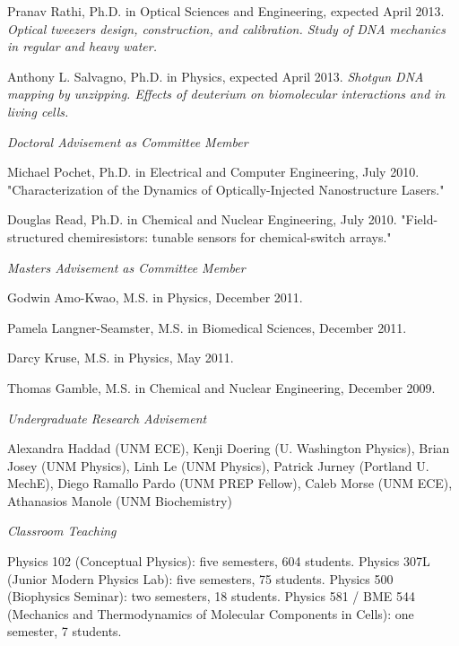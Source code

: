 \documentclass[11pt]{article}
\begin{document}
\ind Pranav Rathi, Ph.D. in Optical Sciences and Engineering, expected April 2013.  \emph{Optical tweezers design, construction, and calibration. Study of DNA mechanics in regular and heavy water.}

\ind Anthony L. Salvagno, Ph.D. in Physics, expected April 2013. \emph{Shotgun DNA mapping by unzipping. Effects of deuterium on biomolecular interactions and in living cells.}       

\medskip
\noindent\emph{Doctoral Advisement as Committee Member \vspace{0.01in}}

\ind Michael Pochet, Ph.D. in Electrical and Computer Engineering, July 2010. "Characterization of the Dynamics of Optically-Injected Nanostructure Lasers."

\ind Douglas Read, Ph.D. in Chemical and Nuclear Engineering, July 2010. "Field-structured chemiresistors: tunable sensors for chemical-switch arrays."

\medskip

\noindent\emph{Masters Advisement as Committee Member \vspace{0.01in}}

\ind Godwin Amo-Kwao, M.S. in Physics, December 2011.

\ind Pamela Langner-Seamster, M.S. in Biomedical Sciences, December 2011.

\ind Darcy Kruse, M.S. in Physics, May 2011.

\ind Thomas Gamble, M.S. in Chemical and Nuclear Engineering, December 2009.

\medskip

\noindent\emph{Undergraduate Research Advisement \vspace{0.01in}}

\ind Alexandra Haddad (UNM ECE), Kenji Doering (U. Washington Physics), Brian Josey (UNM Physics), Linh Le (UNM Physics), Patrick Jurney (Portland U. MechE), Diego Ramallo Pardo (UNM PREP Fellow), Caleb Morse (UNM ECE), Athanasios Manole (UNM Biochemistry)

\medskip

\noindent\emph{Classroom Teaching \vspace{0.01in}}

\ind Physics 102 (Conceptual Physics): five semesters, 604 students. Physics 307L (Junior Modern Physics Lab): five semesters, 75 students. Physics 500 (Biophysics Seminar): two semesters, 18 students. Physics 581 / BME 544 (Mechanics and Thermodynamics of Molecular Components in Cells): one semester, 7 students.
\end{document}
